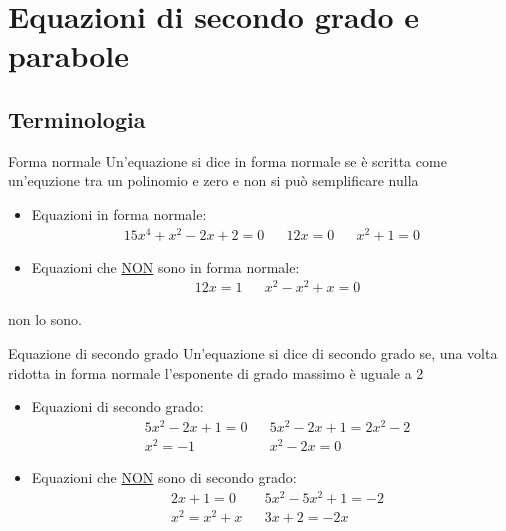 \section{Equazioni di secondo grado e parabole}

\subsection{Terminologia}
\begin{definizione}{Forma normale}
	Un'equazione si dice in forma normale se è scritta come un'equzione tra un polinomio e zero e non si può semplificare nulla
\end{definizione}
\begin{itemize}
	\item Equazioni in forma normale:
	      \begin{align*}
		      15x^{4} + x^2  -2x + 2 = 0 &  & 12x = 0 &  & x^2 + 1 = 0
	      \end{align*}
	\item Equazioni che \underline{NON} sono in forma normale:
	      \begin{align*}
		       & 12x = 1 &  & x^2 - x^2  +x = 0
	      \end{align*}
\end{itemize}
non lo sono.

\begin{definizione}{Equazione di secondo grado}
	Un'equazione si dice di secondo grado se, una volta ridotta in forma normale l'esponente di grado massimo è uguale a 2
\end{definizione}
\begin{itemize}
	\item Equazioni di secondo grado:
	      \begin{align*}
		       & 5x^2 -2x + 1 = 0 &  & 5x^2 -2x + 1 = 2x^2  -2 \\
		       & x^2  = -1        &  & x^2 -2x = 0
	      \end{align*}
	\item Equazioni che \underline{NON} sono di secondo grado:
	      \begin{align*}
		       & 2x + 1 = 0     &  & 5x^2 -5x^2  + 1 =  -2 \\
		       & x^2  = x^2 + x &  & 3x + 2 = -2x
	      \end{align*}
\end{itemize}

